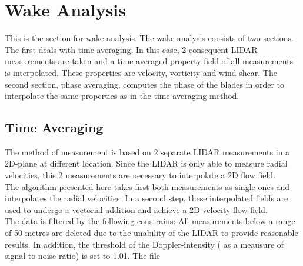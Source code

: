 \documentclass[
12pt,
a4paper,
twoside]
{article}
\begin{document}
\lstset{language=Matlab}				%



\newpage

\tableofcontents

\newpage

\section{Wake Analysis}
This is the section for wake analysis. The wake analysis consists of two sections. The first deals with time averaging. In this case, 2 consequent LIDAR measurements are taken and a time averaged property field of all measurements is interpolated. These properties are velocity, vorticity and wind shear,\newline
The second section, phase averaging, computes the phase of the blades in order to interpolate the same properties as in the time averaging method.

\subsection{Time Averaging}
The method of measurement is based on 2 separate LIDAR measurements in a 2D-plane at different location. Since the LIDAR is only able to measure radial velocities, this 2 measurements are necessary to interpolate a 2D flow field.\\
The algorithm presented here takes first both measurements as single ones and interpolates the radial velocities. In a second step, these interpolated fields are used to undergo a vectorial addition and achieve a 2D velocity flow field.\\
The data is filtered by the following constrains: All measurements below a range of 50 metres are deleted due to the unability of the LIDAR to provide reasonable results. In addition, the threshold of the Doppler-intensity ( as a meausure of signal-to-noise ratio) is set to 1.01.
The file 
\end{document}
